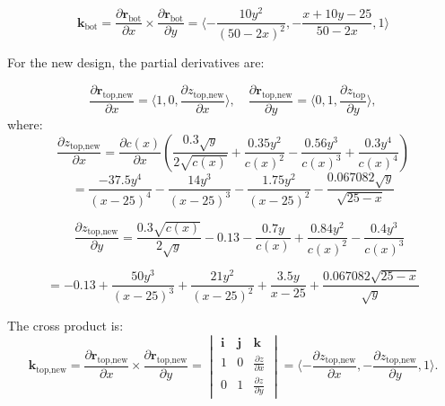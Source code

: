 \documentclass[12pt]{article}
\begin{document}
\[\mathbf{k}_\text{bot} = \frac{\partial \mathbf{r}_{\text{bot}}}{\partial x} \times \frac{\partial \mathbf{r}_{\text{bot}}}{\partial y} = \langle -\frac{10y^2}{(50 - 2x)^2}, -\frac{x + 10y - 25}{50 - 2x}, 1 \rangle\]

For the new design, the partial derivatives are:










\[
\frac{\partial \mathbf{r}_{\text{top,new}}}{\partial x} = \langle 1, 0, \frac{\partial z_{\text{top,new}}}{\partial x} \rangle, \quad
\frac{\partial \mathbf{r}_{\text{top,new}}}{\partial y} = \langle 0, 1, \frac{\partial z_{\text{top}}}{\partial y} \rangle,
\]
where:
\small{
\[\frac{\partial z_{\text{top,new}}}{\partial x}= \frac{\partial c(x)}{\partial x}\left( \frac{0.3\sqrt{y}}{2\sqrt{c(x)}} + \frac{0.35y^2}{c(x)^2} - \frac{0.56y^3}{c(x)^3} + \frac{0.3y^4}{c(x)^4} \right)\]
\[
= \frac{-37.5y^4}{(x-25)^4} - \frac{14y^3}{(x-25)^3} - \frac{1.75y^2}{(x-25)^2} - \frac{0.067082\sqrt{y}}{\sqrt{25-x}} \]
}

\[
\quad \frac{\partial z_{\text{top,new}}}{\partial y} = \frac{0.3\sqrt{c(x)}}{2\sqrt{y}} - 0.13 - \frac{0.7y}{c(x)} + \frac{0.84y^2}{c(x)^2} - \frac{0.4y^3}{c(x)^3} \]

\[ = -0.13 + \frac{50y^3}{(x - 25)^3} + \frac{21y^2}{(x - 25)^2} + \frac{3.5y}{x - 25} + \frac{0.067082\sqrt{25 - x}}{\sqrt{y}}\]

The cross product is:
\[
\mathbf{k}_\text{top,new} = \frac{\partial \mathbf{r}_{\text{top,new}}}{\partial x} \times \frac{\partial \mathbf{r}_{\text{top,new}}}{\partial y} =
\begin{vmatrix}
\mathbf{i} & \mathbf{j} & \mathbf{k} \\
1 & 0 & \frac{\partial z}{\partial x} \\
0 & 1 & \frac{\partial z}{\partial y}
\end{vmatrix} = \langle -\frac{\partial z_{\text{top,new}}}{\partial x}, -\frac{\partial z_{\text{top,new}}}{\partial y}, 1 \rangle.
\]
\end{document}
